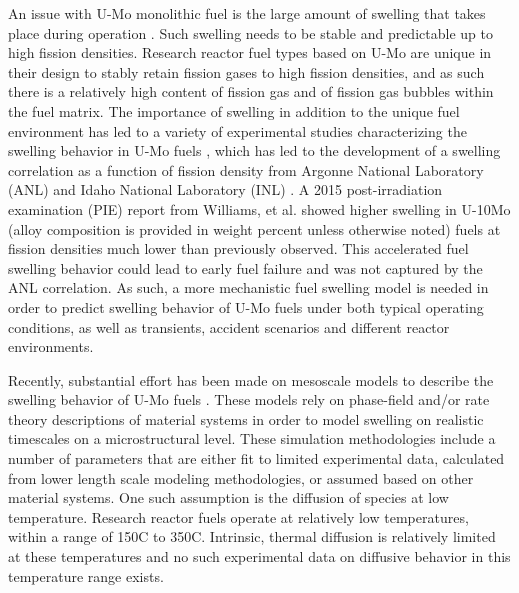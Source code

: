 \documentclass[review]{elsarticle}
\begin{document}
An issue with U-Mo monolithic fuel is the large amount of swelling that takes place during operation \cite{hofman1997}. Such swelling needs to be stable and predictable up to high fission densities. Research reactor fuel types based on U-Mo are unique in their design to stably retain fission gases to high fission densities, and as such there is a relatively high content of fission gas and of fission gas bubbles within the fuel matrix. The importance of swelling in addition to the unique fuel environment has led to a variety of experimental studies characterizing the swelling behavior in U-Mo fuels \cite{rest2009, kim_anl08, meyer2002, kim2013}, which has led to the development of a swelling correlation as a function of fission density from Argonne National Laboratory (ANL) \cite{kim2011} and Idaho National Laboratory (INL) \cite{umo_prelim_report2017}. A 2015 post-irradiation examination (PIE) report \cite{afip6report} from Williams, et al. showed higher swelling in U-10Mo (alloy composition is provided in weight percent unless otherwise noted) fuels at fission densities much lower than previously observed. This accelerated fuel swelling behavior could lead to early fuel failure and was not captured by the ANL correlation. As such, a more mechanistic fuel swelling model is needed in order to predict swelling behavior of U-Mo fuels under both typical operating conditions, as well as transients, accident scenarios and different reactor environments.

Recently, substantial effort has been made on mesoscale models to describe the swelling behavior of U-Mo fuels \cite{liang2018, liang2018a, liang2017, liang2016, ye2018, hu2017a, hu2016, hu2016a}. These models rely on phase-field and/or rate theory descriptions of material systems in order to model swelling on realistic timescales on a microstructural level. These simulation methodologies include a number of parameters that are either fit to limited experimental data, calculated from lower length scale modeling methodologies, or assumed based on other material systems. One such assumption is the diffusion of species at low temperature. Research reactor fuels operate at relatively low temperatures, within a range of 150\degree C to 350\degree C. Intrinsic, thermal diffusion is relatively limited at these temperatures and no such experimental data on diffusive behavior in this temperature range exists. 
\end{document}
